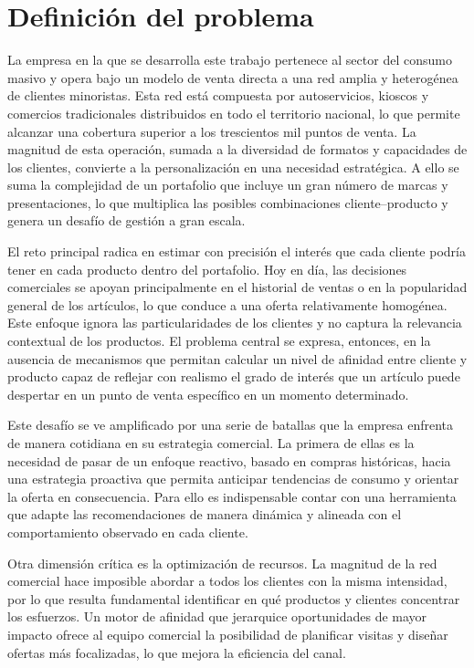 
\section{Definición del problema}

La empresa en la que se desarrolla este trabajo pertenece al sector del consumo masivo y opera bajo un modelo de venta directa a una red amplia y heterogénea de clientes minoristas. Esta red está compuesta por autoservicios, kioscos y comercios tradicionales distribuidos en todo el territorio nacional, lo que permite alcanzar una cobertura superior a los trescientos mil puntos de venta. La magnitud de esta operación, sumada a la diversidad de formatos y capacidades de los clientes, convierte a la personalización en una necesidad estratégica. A ello se suma la complejidad de un portafolio que incluye un gran número de marcas y presentaciones, lo que multiplica las posibles combinaciones cliente–producto y genera un desafío de gestión a gran escala.

El reto principal radica en estimar con precisión el interés que cada cliente podría tener en cada producto dentro del portafolio. Hoy en día, las decisiones comerciales se apoyan principalmente en el historial de ventas o en la popularidad general de los artículos, lo que conduce a una oferta relativamente homogénea. Este enfoque ignora las particularidades de los clientes y no captura la relevancia contextual de los productos. El problema central se expresa, entonces, en la ausencia de mecanismos que permitan calcular un nivel de afinidad entre cliente y producto capaz de reflejar con realismo el grado de interés que un artículo puede despertar en un punto de venta específico en un momento determinado.

Este desafío se ve amplificado por una serie de batallas que la empresa enfrenta de manera cotidiana en su estrategia comercial. La primera de ellas es la necesidad de pasar de un enfoque reactivo, basado en compras históricas, hacia una estrategia proactiva que permita anticipar tendencias de consumo y orientar la oferta en consecuencia. Para ello es indispensable contar con una herramienta que adapte las recomendaciones de manera dinámica y alineada con el comportamiento observado en cada cliente.

Otra dimensión crítica es la optimización de recursos. La magnitud de la red comercial hace imposible abordar a todos los clientes con la misma intensidad, por lo que resulta fundamental identificar en qué productos y clientes concentrar los esfuerzos. Un motor de afinidad que jerarquice oportunidades de mayor impacto ofrece al equipo comercial la posibilidad de planificar visitas y diseñar ofertas más focalizadas, lo que mejora la eficiencia del canal.

